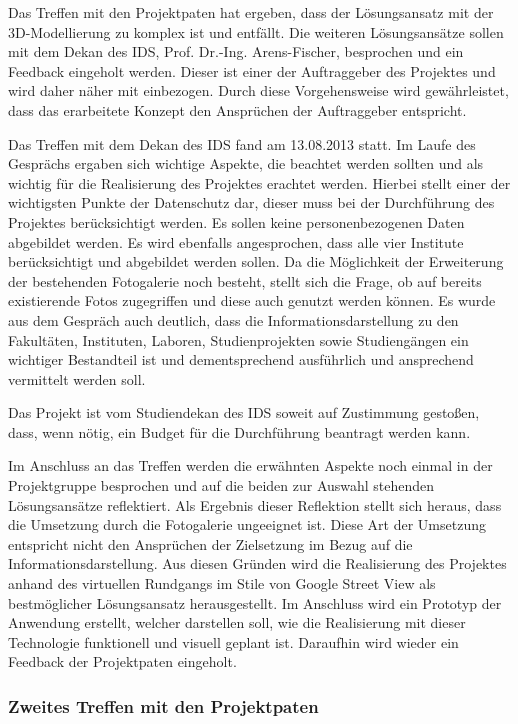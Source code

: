 Das Treffen mit den Projektpaten hat ergeben, dass der Lösungsansatz mit der 3D-Modellierung zu komplex ist und entfällt.
Die weiteren Lösungsansätze sollen mit dem Dekan des IDS, Prof. Dr.-Ing. Arens-Fischer, besprochen und ein Feedback 
eingeholt werden. Dieser ist einer der Auftraggeber des Projektes und wird daher näher mit einbezogen. Durch diese 
Vorgehensweise wird gewährleistet, dass das erarbeitete Konzept den Ansprüchen der Auftraggeber entspricht.

Das Treffen mit dem Dekan des IDS fand am 13.08.2013 statt.
Im Laufe des Gesprächs ergaben sich wichtige Aspekte, die beachtet werden sollten und als wichtig für die Realisierung 
des Projektes erachtet werden. Hierbei stellt einer der wichtigsten Punkte der Datenschutz dar, dieser muss bei der 
Durchführung des Projektes berücksichtigt werden. Es sollen keine personenbezogenen Daten abgebildet werden.
Es wird ebenfalls angesprochen, dass alle vier Institute berücksichtigt und abgebildet werden sollen. Da die Möglichkeit 
der Erweiterung der bestehenden Fotogalerie noch besteht, stellt sich die Frage, ob auf bereits existierende Fotos 
zugegriffen und diese auch genutzt werden können. 
Es wurde aus dem Gespräch auch deutlich, dass die Informationsdarstellung zu den Fakultäten, Instituten, Laboren, 
Studienprojekten sowie Studiengängen ein wichtiger Bestandteil ist und dementsprechend ausführlich und ansprechend 
vermittelt werden soll.

Das Projekt ist vom Studiendekan des IDS soweit auf Zustimmung gestoßen, dass, wenn nötig, ein Budget für die 
Durchführung beantragt werden kann.

Im Anschluss an das Treffen werden die erwähnten Aspekte noch einmal in der Projektgruppe besprochen und auf die beiden 
zur Auswahl stehenden Lösungsansätze reflektiert. Als Ergebnis dieser Reflektion stellt sich heraus, dass die Umsetzung 
durch die Fotogalerie ungeeignet ist. Diese Art der Umsetzung entspricht nicht den Ansprüchen der Zielsetzung im Bezug 
auf die Informationsdarstellung.
Aus diesen Gründen wird die Realisierung des Projektes anhand des virtuellen Rundgangs im Stile von Google Street View 
als bestmöglicher Lösungsansatz herausgestellt. Im Anschluss wird ein Prototyp der Anwendung erstellt, welcher darstellen 
soll, wie die Realisierung mit dieser Technologie funktionell und visuell geplant ist. Daraufhin wird wieder ein Feedback 
der Projektpaten eingeholt.

\subsubsection*{Zweites Treffen mit den Projektpaten}
\label{sec:Treffen3}

